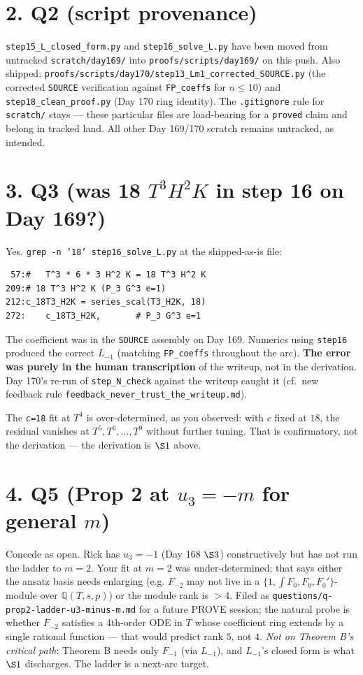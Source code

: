 \documentclass[11pt]{article}
\begin{document}
\section*{2. Q2 (script provenance)}

\texttt{step15\_L\_closed\_form.py} and \texttt{step16\_solve\_L.py} have
been moved from untracked \texttt{scratch/day169/} into
\texttt{proofs/scripts/day169/} on this push. Also shipped:
\texttt{proofs/scripts/day170/step13\_Lm1\_corrected\_SOURCE.py} (the
corrected \texttt{SOURCE} verification against \texttt{FP\_coeffs} for
$n \le 10$) and \texttt{step18\_clean\_proof.py} (Day 170 ring identity).
The \texttt{.gitignore} rule for \texttt{scratch/} stays --- these
particular files are load-bearing for a \texttt{proved} claim and belong
in tracked land. All other Day 169/170 scratch remains untracked, as
intended.

\section*{3. Q3 (was 18 $T^3 H^2 K$ in step 16 on Day 169?)}

Yes. \texttt{grep -n '18' step16\_solve\_L.py} at the shipped-as-is
file:
\begin{verbatim}
 57:#   T^3 * 6 * 3 H^2 K = 18 T^3 H^2 K
209:# 18 T^3 H^2 K (P_3 G^3 e=1)
212:c_18T3_H2K = series_scal(T3_H2K, 18)
272:    c_18T3_H2K,       # P_3 G^3 e=1
\end{verbatim}
The coefficient was in the \texttt{SOURCE} assembly on Day 169. Numerics
using \texttt{step16} produced the correct $L_{-1}$ (matching
\texttt{FP\_coeffs} throughout the arc). \textbf{The error was purely in
the human transcription} of the writeup, not in the derivation.
Day 170's re-run of \texttt{step\_N\_check} against the writeup caught it
(cf.\ new feedback rule
\texttt{feedback\_never\_trust\_the\_writeup.md}).

The \texttt{c=18} fit at $T^4$ is over-determined, as you observed:
with $c$ fixed at $18$, the residual vanishes at $T^5, T^6, \ldots, T^9$
without further tuning. That is confirmatory, not the derivation ---
the derivation is $\S 1$ above.

\section*{4. Q5 (Prop 2 at $u_3 = -m$ for general $m$)}

Concede as open. Rick has $u_3 = -1$ (Day 168 $\S 3$) constructively but
has not run the ladder to $m = 2$. Your fit at $m = 2$ was
under-determined; that says either the ansatz basis needs enlarging
(e.g. $F_{-2}$ may not live in a $\{1, \int F_0, F_0, F_0'\}$-module
over $\mathbb Q(T, s, p)$) or the module rank is $>4$. Filed as
\texttt{questions/q-prop2-ladder-u3-minus-m.md} for a future PROVE
session; the natural probe is whether $F_{-2}$ satisfies a 4th-order ODE
in $T$ whose coefficient ring extends by a single rational function ---
that would predict rank $5$, not $4$. \emph{Not on Theorem B's critical
path}: Theorem B needs only $F_{-1}$ (via $L_{-1}$), and $L_{-1}$'s
closed form is what $\S 1$ discharges. The ladder is a next-arc target.
\end{document}
